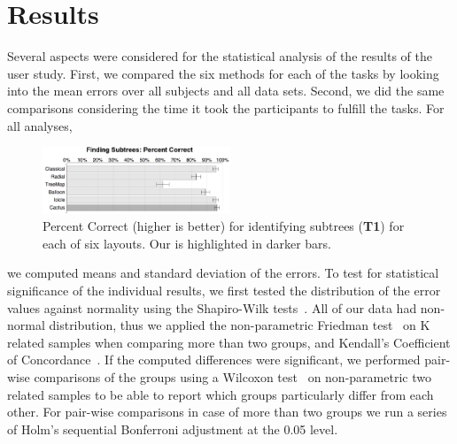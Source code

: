 \documentclass[a4paper]{llncs}
\begin{document}
\section{Results}
Several aspects were considered for the statistical analysis of the results of the user study. First, we compared the six methods for each of the tasks by looking into the mean errors over all subjects and all data sets. Second, we did the same comparisons considering the time it took the participants to fulfill the tasks. For all analyses,\begin{figure}
 \centering
 \includegraphics[width=0.5\textwidth]{figures2/T1-correct.png}
 \caption{\label{fig:T1-correct} Percent Correct (higher is better) for identifying subtrees (\textbf{T1}) for each of six layouts. Our \theName{} is highlighted in darker bars.}
\end{figure} we computed means and standard deviation of the errors. To test for statistical significance of the individual results, we first tested the distribution of the error values against normality using the Shapiro-Wilk tests~\cite{shapiro1965analysis}. All of our data had non-normal distribution, thus we applied the non-parametric Friedman test~\cite{friedman1937use} on K related samples when comparing more than two groups, and Kendall's Coefficient of Concordance~\cite{legendre2005species}. If the computed differences were significant, we performed pair-wise comparisons of the groups using a Wilcoxon test~\cite{wilcoxon1945individual} on non-parametric two related samples to be able to report which groups particularly differ from each other. For pair-wise comparisons in case of more than two groups we run a series of Holm's sequential Bonferroni adjustment at the 0.05 level. 
\end{document}
